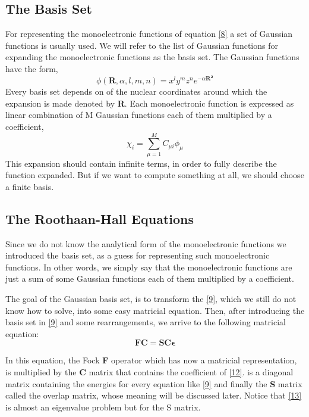 \documentclass{tmr}
\begin{document}
\subsection{The Basis Set}
For representing the monoelectronic functions of equation \eqref{8} a set of Gaussian 
functions is usually used. We will refer to the list of Gaussian functions for 
expanding the monoelectronic functions as the basis set. The Gaussian
functions have the form,
\begin{equation}\label{11}
\phi(\mathbf{R},\alpha,l,m,n) = x^{l}y^{m}z^{n} e^{-\alpha\mathbf{R^{2}}}
\end{equation}
Every basis set depends on of the nuclear coordinates around
which the expansion is made denoted by \textbf{R}. Each monoelectronic 
function is expressed as linear combination of M Gaussian 
functions each of them multiplied by a coefficient,
\begin{equation}\label{12}
\chi_{i} = \sum_{\mu = 1}^{M} C_{\mu i} \phi_{\mu}
\end{equation}
This expansion should contain infinite terms, in order to 
fully describe the function expanded. But if we
want to compute something at all, we should choose a finite basis.

\subsection{The Roothaan-Hall Equations}
Since we do not know the analytical form of the monoelectronic functions we introduced
the basis set, as a guess for representing such monoelectronic functions. In other words,
we simply say that the monoelectronic functions are just a sum of some Gaussian functions
each of them multiplied by a coefficient.

The goal of the Gaussian basis set, is to transform the \eqref{9}, which we still do not know 
how to solve, into some easy matricial equation. Then, after introducing the basis set in \eqref{9}
and some rearrangements, we arrive to the following matricial equation:
\begin{equation}\label{13}
\mathbf{FC} = \mathbf{SC\epsilon}
\end{equation}

In this equation, the Fock \textbf{F} operator which has now a matricial representation, is multiplied by
the \textbf{C} matrix that contains the coefficient of \eqref{12}. \textbf{\textepsilon}
is a diagonal matrix containing the energies for every equation like \eqref{9} and finally
the \textbf{S} matrix called the overlap matrix, whose meaning will be discussed later. Notice
that \eqref{13} is almost an eigenvalue problem but for the S matrix.
\end{document}

